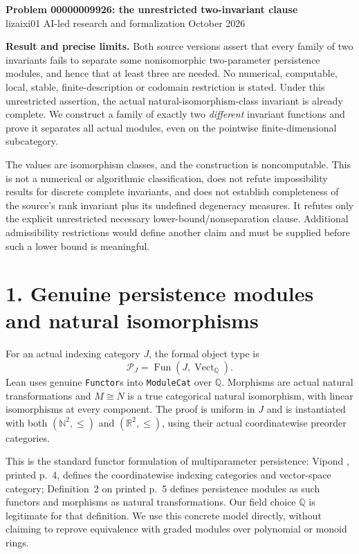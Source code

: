 \documentclass[10pt]{article}
\begin{document}
\begin{center}
{\Large\bfseries Problem 00000009926: the unrestricted two-invariant clause}\\[5pt]
lizaixi01 \quad AI-led research and formalization  October 2026
\end{center}

\textbf{Result and precise limits.} Both source versions assert that every family of two invariants fails to separate some nonisomorphic two-parameter persistence modules, and hence that at least three are needed. No numerical, computable, local, stable, finite-description or codomain restriction is stated. Under this unrestricted assertion, the actual natural-isomorphism-class invariant is already complete. We construct a family of exactly two \emph{different} invariant functions and prove it separates all actual modules, even on the pointwise finite-dimensional subcategory.

The values are isomorphism classes, and the construction is noncomputable. This is not a numerical or algorithmic classification, does not refute impossibility results for discrete complete invariants, and does not establish completeness of the source's rank invariant plus its undefined degeneracy measures. It refutes only the explicit unrestricted necessary lower-bound/nonseparation clause. Additional admissibility restrictions would define another claim and must be supplied before such a lower bound is meaningful.

\section*{1. Genuine persistence modules and natural isomorphisms}
For an actual indexing category $J$, the formal object type is
\[
 \mathcal P_J=\operatorname{Fun}(J,\operatorname{Vect}_{\mathbb Q}).
\]
Lean uses genuine \texttt{Functor}s into \texttt{ModuleCat} over $\mathbb Q$. Morphisms are actual natural transformations and $M\cong N$ is a true categorical natural isomorphism, with linear isomorphisms at every component. The proof is uniform in $J$ and is instantiated with both $(\mathbb N^2,\le)$ and $(\mathbb R^2,\le)$, using their actual coordinatewise preorder categories.

This is the standard functor formulation of multiparameter persistence: Vipond \cite{V}, printed p.~4, defines the coordinatewise indexing categories and vector-space category; Definition~2 on printed p.~5 defines persistence modules as such functors and morphisms as natural transformations. Our field choice $\mathbb Q$ is legitimate for that definition. We use this concrete model directly, without claiming to reprove equivalence with graded modules over polynomial or monoid rings.
\end{document}
